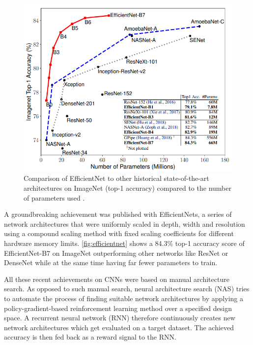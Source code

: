 \begin{figure}[t]
	\begin{center}
		\includegraphics[width=\linewidth]{images/efficientnet.PNG}
	\end{center}
	\caption{Comparison of EfficientNet to other historical state-of-the-art architectures on ImageNet (top-1 accuracy) compared to the number of parameters used \cite{LeMingxingTan.2019}.}
	\label{fig:efficientnet}
\end{figure}

A groundbreaking achievement was published with EfficientNets, a series of network architectures that were uniformly scaled in depth, width and resolution using a compound scaling method with fixed scaling coefficients for different hardware memory limits. \autoref{fig:efficientnet} shows a 84.3\% top-1 accuracy score of EfficientNet-B7 on ImageNet \cite{JiaDeng.2009} outperforming other networks like ResNet or DenseNet while at the same time having far fewer parameters to train. \cite{LeMingxingTan.2019}

All these recent achievements on CNNs were based on manual architecture search. As opposed to such manual search, neural architecture search (NAS) tries to automate the process of finding suitable network architectures by applying a policy-gradient-based reinforcement learning method over a specified design space. A recurrent neural network (RNN) therefore continuously creates new network architectures which get evaluated on a target dataset. The achieved accuracy is then fed back as a reward signal to the RNN. \cite{LeBarretZoph.2017}

